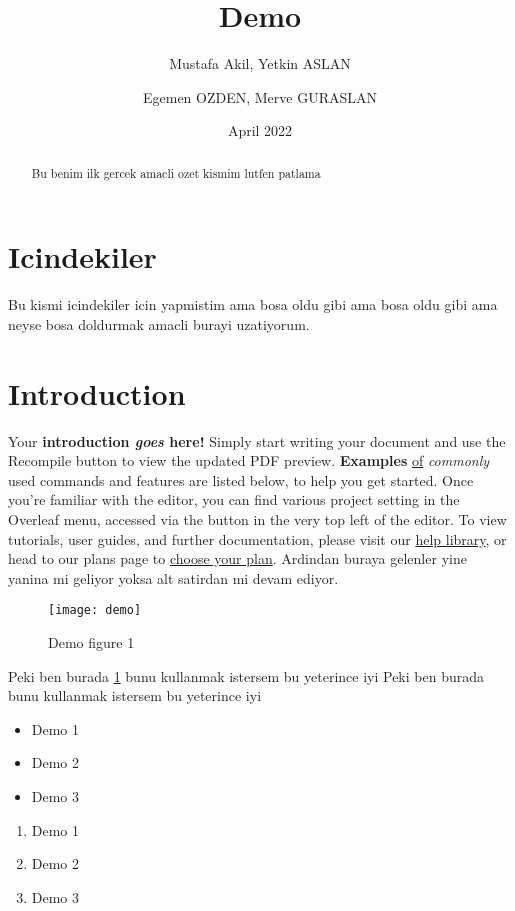 \documentclass[12pt]{article}
\title{Demo}
\author{Mustafa Akil, Yetkin ASLAN}
\author{Egemen OZDEN, Merve GURASLAN}
\date{April 2022}
\begin{document}
\maketitle

\tableofcontents \newpage

\begin{abstract}
    Bu benim ilk gercek amacli ozet kismim lutfen patlama
\end{abstract}


\section{Icindekiler}
Bu kismi icindekiler icin yapmistim ama bosa oldu gibi ama bosa oldu gibi ama neyse bosa doldurmak amacli burayi uzatiyorum.

\section{Introduction}
Your \textbf{introduction \emph{goes} here!} Simply start writing your document and use the Recompile button to view the updated PDF preview. \textbf{Examples} \underline{of} \textit{commonly} used commands and features are listed below, to help you get started.  Once you're familiar with the editor, you can find various project setting in the Overleaf menu, accessed via the button in the very top left of the editor. To view tutorials, user guides, and further documentation, please visit our \href{https://www.overleaf.com/learn}{help library}, or head to our plans page to \href{https://www.overleaf.com/user/subscription/plans}{choose your plan}. Ardindan buraya gelenler yine yanina mi geliyor yoksa alt satirdan mi devam ediyor.

\begin{figure}[h]
    \centering
    \texttt{[image: demo]}
    \caption{Demo figure 1}
    \label{fig:demo1}
\end{figure}

Peki ben burada \ref{fig:demo1} bunu kullanmak istersem bu yeterince iyi
Peki ben burada \pageref{fig:demo1} bunu kullanmak istersem bu yeterince iyi

\begin{itemize}
    \item Demo 1
    \item Demo 2
    \item Demo 3
\end{itemize}

\begin{enumerate}
    \item Demo 1
    \item Demo 2
    \item Demo 3
\end{enumerate}
\end{document}
